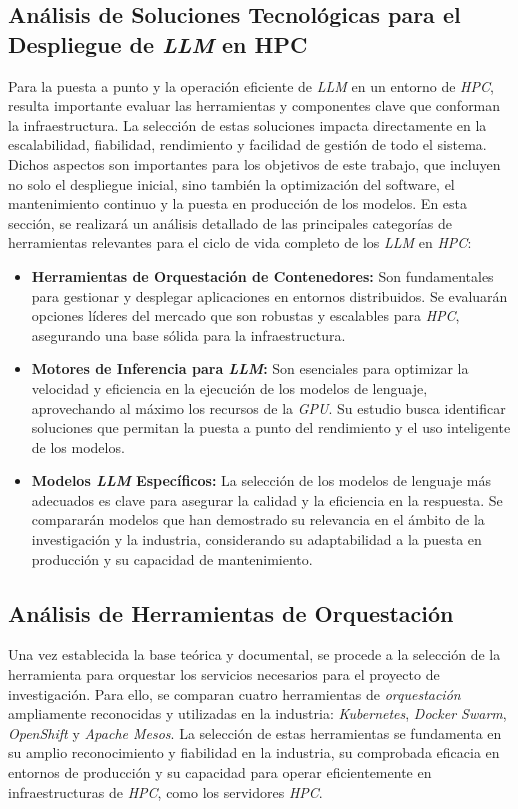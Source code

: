 \subsection{Análisis de Soluciones Tecnológicas para el Despliegue de \textit{LLM} en HPC}
Para la puesta a punto y la operación eficiente de \textit{LLM} en un entorno de \textit{HPC}, resulta importante evaluar las herramientas y componentes clave que conforman la infraestructura. La selección de estas soluciones impacta directamente en la escalabilidad, fiabilidad, rendimiento y facilidad de gestión de todo el sistema. Dichos aspectos son importantes para los objetivos de este trabajo, que incluyen no solo el despliegue inicial, sino también la optimización del software, el mantenimiento continuo y la puesta en producción de los modelos.
\newpage
En esta sección, se realizará un análisis detallado de las principales categorías de herramientas relevantes para el ciclo de vida completo de los \textit{LLM} en \textit{HPC}:
\begin{itemize}
    \item \textbf{Herramientas de Orquestación de Contenedores:} Son fundamentales para gestionar y desplegar aplicaciones en entornos distribuidos. Se evaluarán opciones líderes del mercado que son robustas y escalables para \textit{HPC}, asegurando una base sólida para la infraestructura.
    \item \textbf{Motores de Inferencia para \textit{LLM}:} Son esenciales para optimizar la velocidad y eficiencia en la ejecución de los modelos de lenguaje, aprovechando al máximo los recursos de la \textit{GPU}. Su estudio busca identificar soluciones que permitan la puesta a punto del rendimiento y el uso inteligente de los modelos.
    \item \textbf{Modelos \textit{LLM} Específicos:} La selección de los modelos de lenguaje más adecuados es clave para asegurar la calidad y la eficiencia en la respuesta. Se compararán modelos que han demostrado su relevancia en el ámbito de la investigación y la industria, considerando su adaptabilidad a la puesta en producción y su capacidad de mantenimiento.
\end{itemize}

\subsection{Análisis de Herramientas de Orquestación}
Una vez establecida la base teórica y documental, se procede a la selección de la herramienta para orquestar los servicios necesarios para el proyecto de investigación. Para ello, se comparan cuatro herramientas de \textit{orquestación} ampliamente reconocidas y utilizadas en la industria: \textit{Kubernetes}, \textit{Docker Swarm}, \textit{OpenShift} y \textit{Apache Mesos}. La selección de estas herramientas se fundamenta en su amplio reconocimiento y fiabilidad en la industria, su comprobada eficacia en entornos de producción y su capacidad para operar eficientemente en infraestructuras de \textit{HPC}, como los servidores \textit{HPC}.

